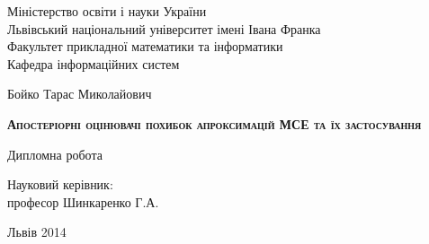 \begin{titlepage}

\begin{center}
Міністерство освіти і науки України \\
Львівський національний університет імені Івана Франка\\
Факультет прикладної математики та інформатики\\
Кафедра інформаційних систем
\end{center}

\vspace{8em}

\begin{center}
Бойко Тарас Миколайович
\end{center}

\begin{center}
\large
\textsc{\textbf{Апостеріорні оцінювачі похибок апроксимацій МСЕ та їх застосування}}
\end{center}

\begin{center}
Дипломна робота
\end{center}

\vspace{12em}

\begin{flushright}
\begin{minipage}{0.4\textwidth}
Науковий керівник:\\
професор Шинкаренко Г.А.
\end{minipage}
\end{flushright}

\vspace{\fill}

\begin{center}
Львів 2014
\end{center}

\end{titlepage}
